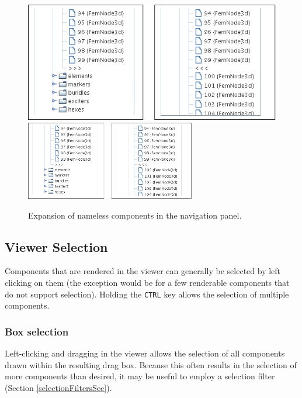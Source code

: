 \documentclass{article}
\begin{document}
\begin{figure}
\begin{center}
\iflatexml
\includegraphics[]{images/navpanelContractExpand}
\else
\includegraphics[width=0.66\textwidth]{images/navpanelContractExpand}
\fi
\end{center}
\caption{Expansion of nameless components in the navigation panel.}%
\label{navpanelExpandContractFig}
\end{figure}

\subsection{Viewer Selection}
\label{viewerSelectionSec}

Components that are rendered in the viewer can generally be selected
by left clicking on them (the exception would be for a few renderable
components that do not support selection). Holding the {\tt CTRL} key
allows the selection of multiple components.

\subsubsection{Box selection}

Left-clicking and dragging in the viewer allows the selection of all
components drawn within the resulting drag box. Because this often
results in the selection of more components than desired, it may be
useful to employ a selection filter (Section
\ref{selectionFiltersSec}).
\end{document}
